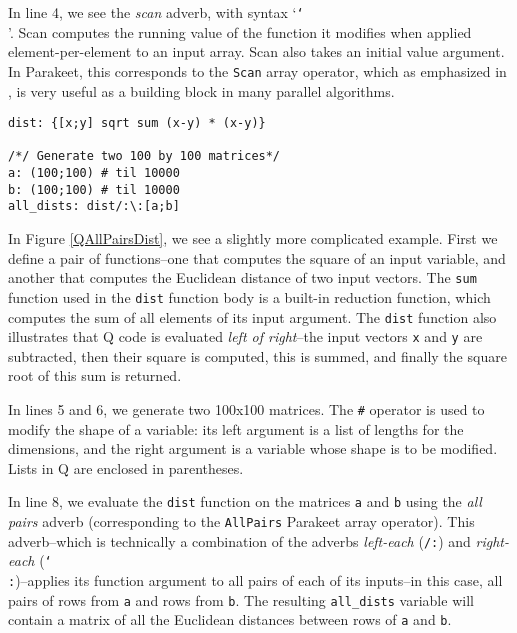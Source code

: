 \documentclass[preprint]{sigplanconf}
\begin{document}
In line 4, we see the \emph{scan} adverb, with syntax `\texttt{\char`\\}'.
Scan computes the running value of the function it modifies when applied
element-per-element to an input array. Scan also takes an initial value
argument.  In Parakeet, this corresponds to the \texttt{Scan} array operator,
which as emphasized in \cite{Blel90}, is very useful as a building block in many
parallel algorithms.

\begin{lstlisting}[caption=Q All-Pairs Distance Example]
dist: {[x;y] sqrt sum (x-y) * (x-y)}

/*/ Generate two 100 by 100 matrices*/
a: (100;100) # til 10000
b: (100;100) # til 10000
all_dists: dist/:\:[a;b]
\end{lstlisting}
\label{QAllPairsDist}

In Figure \ref{QAllPairsDist}, we see a slightly more complicated example.
First we define a pair of functions--one that computes the square of an input
variable, and another that computes the Euclidean distance of two input
vectors.  The \texttt{sum} function used in the \texttt{dist} function body is a
built-in reduction function, which computes the sum of all elements of its input
argument.  The \texttt{dist} function also illustrates that Q code is evaluated
\emph{left of right}--the input vectors \texttt{x} and \texttt{y} are
subtracted, then their square is computed, this is summed, and finally the
square root of this sum is returned.

In lines 5 and 6, we generate two 100x100 matrices.  The \texttt{\#} operator is
used to modify the shape of a variable: its left argument is a list of lengths
for the dimensions, and the right argument is a variable whose shape is to be
modified.  Lists in Q are enclosed in parentheses.

In line 8, we evaluate the \texttt{dist} function on the matrices \texttt{a} and
\texttt{b} using the {\it all pairs} adverb (corresponding to the
\texttt{AllPairs} Parakeet array operator).  This adverb--which is technically
a combination of the adverbs \emph{left-each} (\texttt{/:}) and
\emph{right-each} (\texttt{\char`\\:})--applies its function argument to all
pairs of each of its inputs--in this case, all pairs of rows from \texttt{a} and
rows from \texttt{b}.  The resulting \texttt{all\_dists} variable will contain a
matrix of all the Euclidean distances between rows of \texttt{a} and \texttt{b}.
\end{document}
